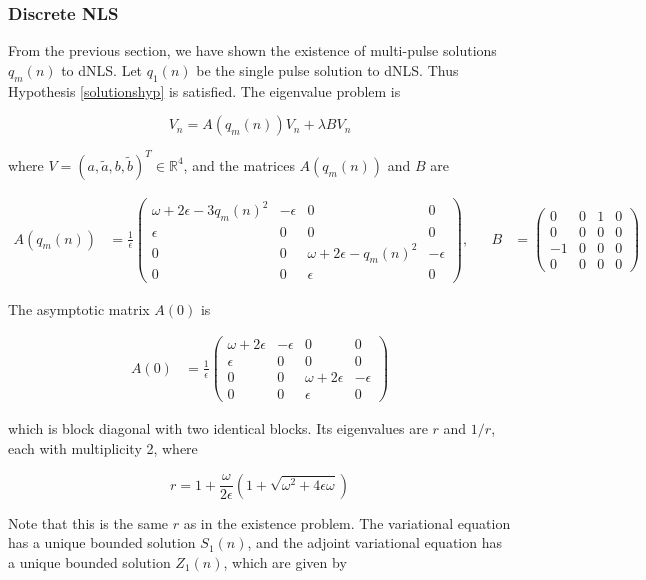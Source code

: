 \documentclass[12pt]{article}
\def\R{{\mathbb R}}
\begin{document}
\subsubsection{Discrete NLS}

From the previous section, we have shown the existence of multi-pulse solutions $q_m(n)$ to dNLS. Let $q_1(n)$ be the single pulse solution to dNLS. Thus Hypothesis \ref{solutionshyp} is satisfied. The eigenvalue problem is

\begin{equation}
V_n = A(q_m(n)) V_n + \lambda B V_n
\end{equation}

where $V = (a, \tilde{a}, b, \tilde{b})^T \in \R^4$, and the matrices $A(q_m(n))$ and $B$ are 

\begin{align*}
A(q_m(n)) &= 
\frac{1}{\epsilon}
\begin{pmatrix}
\omega + 2 \epsilon - 3 q_m(n)^2 & -\epsilon & 0 & 0 \\
\epsilon & 0 & 0 & 0 \\
0 & 0 & \omega + 2 \epsilon - q_m(n)^2 & -\epsilon \\
0 & 0 & \epsilon & 0
\end{pmatrix}, &&
B &= \begin{pmatrix}
0 & 0 & 1 & 0 \\
0 & 0 & 0 & 0 \\
-1 & 0 & 0 & 0 \\
0 & 0 & 0 & 0
\end{pmatrix}
\end{align*}

The asymptotic matrix $A(0)$ is

\begin{align*}
A(0) &= 
\frac{1}{\epsilon}
\begin{pmatrix}
\omega + 2 \epsilon & -\epsilon & 0 & 0 \\
\epsilon & 0 & 0 & 0 \\
0 & 0 & \omega + 2 \epsilon & -\epsilon \\
0 & 0 & \epsilon & 0
\end{pmatrix}
\end{align*}

which is block diagonal with two identical blocks. Its eigenvalues are $r$ and $1/r$, each with multiplicity 2, where

\[
r = 1 + \frac{\omega}{2 \epsilon}\left( 1 + \sqrt{\omega^2 + 4 \epsilon \omega } \right)
\]

Note that this is the same $r$ as in the existence problem. The variational equation has a unique bounded solution $S_1(n)$, and the adjoint variational equation has a unique bounded solution $Z_1(n)$, which are given by
\end{document}
